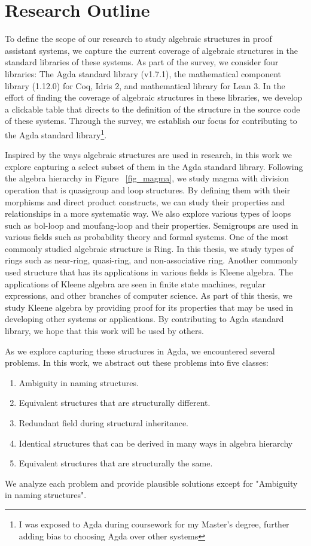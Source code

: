 \section{Research Outline}
To define the scope of our research to study algebraic structures in proof
assistant systems, we capture the current coverage of algebraic structures in
the standard libraries of these systems. As part of the survey, we consider four
libraries: The Agda standard library (v1.7.1), the mathematical component
library (1.12.0) for Coq, Idris 2, and mathematical library for Lean 3. In
the effort of finding the coverage of algebraic structures in these libraries, we
develop a clickable table that directs to the definition of the structure in the
source code of these systems. Through the survey, we establish our focus for
contributing to the Agda standard library\footnote{I was exposed to Agda during
coursework for my Master's degree, further adding bias to choosing Agda over
other systems}.

Inspired by the ways algebraic structures are used in research, in this work we
explore capturing a select subset of them in the Agda standard library.
Following the algebra hierarchy in Figure ~\ref{fig_magma}, we study magma with
division operation that is quasigroup and loop structures. By defining them with
their morphisms and direct product constructs, we can study their properties and
relationships in a more systematic way. We also explore various types of loops
such as bol-loop and moufang-loop and their properties. Semigroups are used in
various fields such as probability theory and formal systems. One of the most
commonly studied algebraic structure is Ring. In this thesis, we study types of
rings such as near-ring, quasi-ring, and non-associative ring. Another commonly
used structure that has its applications in various fields is Kleene algebra.
The applications of Kleene algebra are seen in finite state machines, regular
expressions, and other branches of computer science. As part of this thesis, we
study Kleene algebra by providing proof for its properties that may be used in
developing other systems or applications. By contributing to Agda standard
library, we hope that this work will be used by others. 

As we explore capturing these structures in Agda, we encountered several
problems. In this work, we abstract out these problems into five classes:
\begin{enumerate}
\item Ambiguity in naming structures.
\item Equivalent structures that are structurally different.
\item Redundant field during structural inheritance.
\item Identical structures that can be derived in many ways in algebra hierarchy
\item Equivalent structures that are structurally the same.
\end{enumerate}
We analyze each problem and provide plausible solutions except for "Ambiguity in naming structures".

